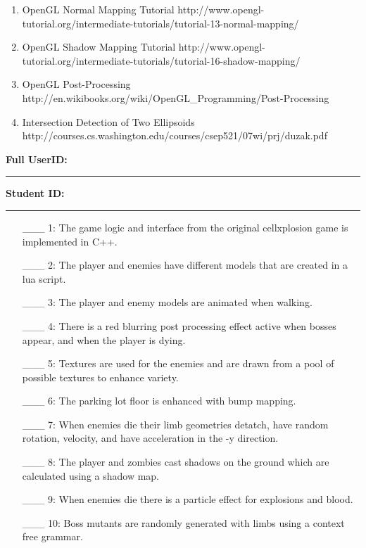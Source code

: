 \documentclass {article}
\begin{document}
\begin{description}
\begin{enumerate}
\item OpenGL Normal Mapping Tutorial http://www.opengl-tutorial.org/intermediate-tutorials/tutorial-13-normal-mapping/

\item OpenGL Shadow Mapping Tutorial http://www.opengl-tutorial.org/intermediate-tutorials/tutorial-16-shadow-mapping/

\item OpenGL Post-Processing http://en.wikibooks.org/wiki/OpenGL\_Programming/Post-Processing

\item Intersection Detection of Two Ellipsoids http://courses.cs.washington.edu/courses/csep521/07wi/prj/duzak.pdf

\end{enumerate}

\end{description}
\newpage



{\hfill{\bf Full UserID:\rule{2in}{.1mm}}\hfill{\bf Student ID:\rule{2in}{.1mm}}\hfill}

\begin{enumerate}
     \item[\_\_\_ 1:]  The game logic and interface from the original cellxplosion game is implemented in C++.

     \item[\_\_\_ 2:]  The player and enemies have different models that are created in a lua script.

     \item[\_\_\_ 3:]  The player and enemy models are animated when walking.

     \item[\_\_\_ 4:]  There is a red blurring post processing effect active when bosses appear, and when the player is dying.

     \item[\_\_\_ 5:]  Textures are used for the enemies and are drawn from a pool of possible textures to enhance variety.

     \item[\_\_\_ 6:]  The parking lot floor is enhanced with bump mapping.

     \item[\_\_\_ 7:]  When enemies die their limb geometries detatch, have random rotation, velocity, and have acceleration in the -y direction.

     \item[\_\_\_ 8:]  The player and zombies cast shadows on the ground which are calculated using a shadow map.

     \item[\_\_\_ 9:]  When enemies die there is a particle effect for explosions and blood.

     \item[\_\_\_ 10:]  Boss mutants are randomly generated with limbs using a context free grammar.
\end{enumerate}

\end{document}
